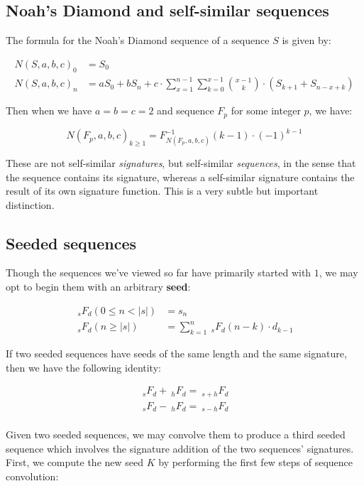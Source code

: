 \documentclass{article}
\begin{document}
\subsection{Noah's Diamond and self-similar sequences}

The formula for the Noah's Diamond sequence of a sequence $S$ is given by:

\begin{align*}
N(S, a, b, c)_0 &= S_0\\
N(S, a, b, c)_n &= aS_0 + bS_n + c \cdot \sum_{x=1}^{n-1} \sum_{k=0}^{x - 1} \binom{x-1}{k} \cdot \left( S_{k+1} + S_{n-x+k} \right)
\end{align*}

\noindent Then when we have $a=b=c=2$ and sequence $F_p$ for some integer $p$, we have:

$$N(F_p, a, b, c)_{k \geq 1} = F^{-1}_{ N(F_p, a, b, c)} (k-1) \cdot (-1)^{k-1}$$

\noindent These are not self-similar \textit{signatures}, but self-similar \textit{sequences}, in the sense that the sequence contains its signature, whereas a self-similar signature contains the result of its own signature function. This is a very subtle but important distinction.

\subsection{Seeded sequences}

\noindent Though the sequences we've viewed so far have primarily started with $1$, we may opt to begin them with an arbitrary \textbf{seed}:

\begin{align*}
~_s F_d (0 \leq n < |s|) &= s_n\\
~_s F_d (n \geq |s|) &= \sum_{k=1}^{n}  ~_s F_d (n-k) \cdot d_{k-1}
\end{align*}

\noindent If two seeded sequences have seeds of the same length and the same signature, then we have the following identity:

\begin{align*}
~_s F_d + ~_h F_d = ~_{s + h} F_d\\
~_s F_d - ~_h F_d = ~_{s - h} F_d\\
\end{align*}

\noindent Given two seeded sequences, we may convolve them to produce a third seeded sequence which involves the signature addition of the two sequences' signatures. First, we compute the new seed $K$ by performing the first few steps of sequence convolution:
\end{document}
